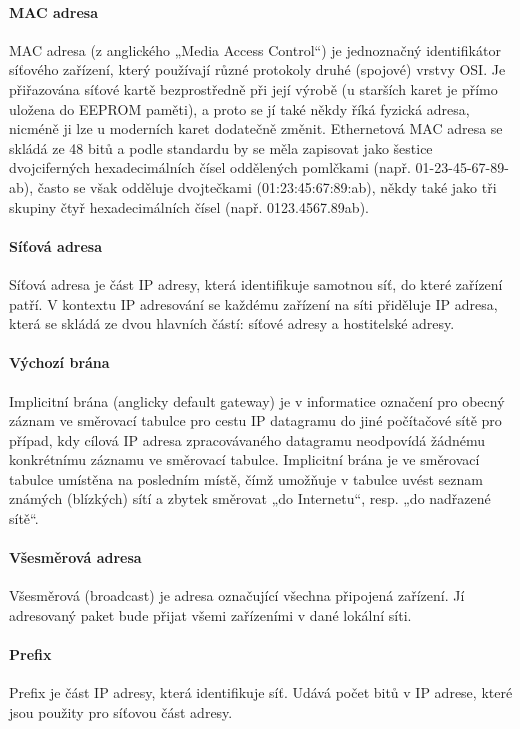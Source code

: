 \paragraph{MAC adresa}
MAC adresa (z anglického „Media Access Control“) je jednoznačný identifikátor síťového zařízení, který používají různé protokoly druhé (spojové) vrstvy OSI. Je přiřazována síťové kartě bezprostředně při její výrobě (u starších karet je přímo uložena do EEPROM paměti), a proto se jí také někdy říká fyzická adresa, nicméně ji lze u moderních karet dodatečně změnit. Ethernetová MAC adresa se skládá ze 48 bitů a podle standardu by se měla zapisovat jako šestice dvojciferných hexadecimálních čísel oddělených pomlčkami (např. 01-23-45-67-89-ab), často se však odděluje dvojtečkami (01:23:45:67:89:ab), někdy také jako tři skupiny čtyř hexadecimálních čísel (např. 0123.4567.89ab). 
\paragraph{Síťová adresa}
Síťová adresa je část IP adresy, která identifikuje samotnou síť, do které zařízení patří. V kontextu IP adresování se každému zařízení na síti přiděluje IP adresa, která se skládá ze dvou hlavních částí: síťové adresy a hostitelské adresy.
\paragraph{Výchozí brána}
Implicitní brána (anglicky default gateway) je v informatice označení pro obecný záznam ve směrovací tabulce pro cestu IP datagramu do jiné počítačové sítě pro případ, kdy cílová IP adresa zpracovávaného datagramu neodpovídá žádnému konkrétnímu záznamu ve směrovací tabulce. Implicitní brána je ve směrovací tabulce umístěna na posledním místě, čímž umožňuje v tabulce uvést seznam známých (blízkých) sítí a zbytek směrovat „do Internetu“, resp. „do nadřazené sítě“. 
\paragraph{Všesměrová adresa}
Všesměrová (broadcast) je adresa označující všechna připojená zařízení. Jí adresovaný paket bude přijat všemi zařízeními v dané lokální síti.

\paragraph{Prefix} Prefix je část IP adresy, která identifikuje síť. Udává počet bitů v IP adrese, které jsou použity pro síťovou část adresy.

